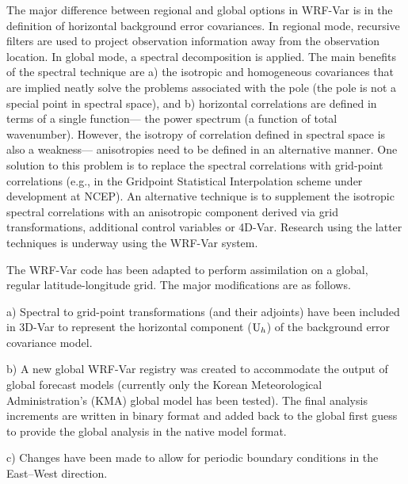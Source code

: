 The major difference between regional and global options in WRF-Var is
in the definition of horizontal background error covariances. In
regional mode, recursive filters \citep{purser03} are used to project
observation information away from the observation location. In global
mode, a spectral decomposition is applied. The main benefits of the
spectral technique are a) the isotropic and homogeneous covariances
that are implied neatly solve the problems associated with the pole
(the pole is not a special point in spectral space), and b) horizontal
correlations are defined in terms of a single function--- the power
spectrum (a function of total wavenumber). However, the isotropy of
correlation defined in spectral space is also a weakness---
anisotropies need to be defined in an alternative manner. One solution
to this problem is to replace the spectral correlations with
grid-point correlations (e.g., in the Gridpoint Statistical
Interpolation scheme under development at NCEP). An alternative
technique is to supplement the isotropic spectral correlations with an
anisotropic component derived via grid transformations, additional
control variables or 4D-Var. Research using the latter techniques is
underway using the WRF-Var system.

The WRF-Var code has been adapted to perform assimilation on a global, regular 
latitude-longitude grid. The major modifications are as follows.

\vspace{0.5cm}

a) Spectral to grid-point transformations (and their adjoints) have been included in 3D-Var 
to represent the horizontal component (${\rm U}_h$) of the background error covariance 
model.

\vspace{0.5cm}

b) A new global WRF-Var registry was created to accommodate the 
output of global forecast models (currently only the Korean Meteorological 
Administration's (KMA) global model has been tested). 
The final analysis increments are written in binary format and added back to the global 
first guess to provide the global analysis in the native model format.

\vspace{0.5cm}

c) Changes have been made to allow for periodic boundary conditions in the East--West 
direction.

\vspace{0.5cm}

